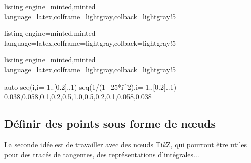 \documentclass[11pt,a4paper]{ltxdoc}
\providecommand\tikzlogo{Ti\textit{k}Z}
\let\TikZ\tikzlogo
\begin{document}
\begin{tcblisting}{listing engine=minted,minted language=latex,colframe=lightgray,colback=lightgray!5}
\begin{GraphiqueTikz}[Xmin=-5,Xmax=5,Ymin=-2,Ymax=5]
\end{GraphiqueTikz}
\end{tcblisting}

\begin{tcblisting}{listing engine=minted,minted language=latex,colframe=lightgray,colback=lightgray!5}
\begin{GraphiqueTikz}[Xmin=-5,Xmax=5,Ymin=-2,Ymax=5]
\end{GraphiqueTikz}
\end{tcblisting}

\begin{tcblisting}{listing engine=minted,minted language=latex,colframe=lightgray,colback=lightgray!5}
\begin{GraphiqueTikz}%
		[x=6cm,y=3cm,Xmin=-1.25,Xmax=1.25,Ymin=-0.5,Ymax=2,
		Xgrille=0.125,Xgrilles=1,Ygrille=0.25,Ygrilles=0.25]
		{auto}
	\GenererPolynomeLagrange%
		{seq(i,i=-1..[0.2]..1)}               %
		{seq(1/(1+25*i^2),i=-1..[0.2]..1)}    %
		{0.038,0.058,0.1,0.2,0.5,1.0,0.5,0.2,0.1,0.058,0.038}
\end{GraphiqueTikz}
\end{tcblisting}

\pagebreak

\subsection{Définir des points sous forme de nœuds}\label{defpts}

La seconde idée est de travailler avec des nœuds \TikZ, qui pourront être utiles pour des tracés de tangentes, des représentations d'intégrales$\ldots$
\end{document}
